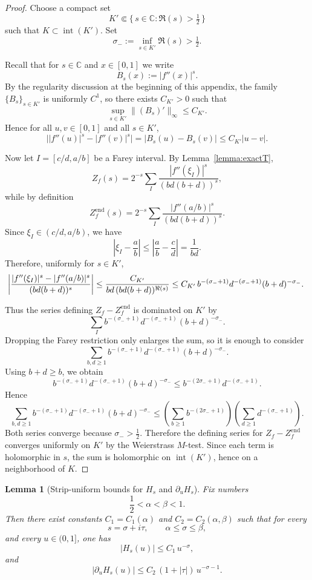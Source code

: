 \documentclass[a4paper,american,11pt]{amsart}
\theoremstyle{plain}
\newtheorem{lemma}[theorem]{Lemma}
\theoremstyle{definition}
\newcommand{\C}{\mathbb C}
\begin{document}
\begin{proof}
Choose a compact set
\[
K'\Subset \{\,s\in\C:\Re(s)>\tfrac12\,\}
\]
such that \(K\subset \operatorname{int}(K')\). Set
\[
\sigma_-:=\inf_{s\in K'}\Re(s)>\tfrac12.
\]

Recall that for \(s\in\C\) and \(x\in[0,1]\) we write
\[
B_s(x):=|f''(x)|^s.
\]
By the regularity discussion at the beginning of this appendix, the family \(\{B_s\}_{s\in K'}\)
is uniformly \(C^1\), so there exists \(C_{K'}>0\) such that
\[
\sup_{s\in K'}\|(B_s)'\|_\infty\le C_{K'}.
\]
Hence for all \(u,v\in[0,1]\) and all \(s\in K'\),
\[
\bigl||f''(u)|^s-|f''(v)|^s\bigr|
=
|B_s(u)-B_s(v)|
\le C_{K'}|u-v|.
\]

Now let \(I=[c/d,a/b]\) be a Farey interval. By Lemma~\ref{lemma:exactT},
\[
Z_f(s)=2^{-s}\sum_I \frac{|f''(\xi_I)|^s}{(bd(b+d))^s},
\]
while by definition
\[
Z_f^{\mathrm{end}}(s)=2^{-s}\sum_I \frac{|f''(a/b)|^s}{(bd(b+d))^s}.
\]
Since \(\xi_I\in(c/d,a/b)\), we have
\[
\left|\xi_I-\frac ab\right|
\le
\left|\frac ab-\frac cd\right|
=
\frac1{bd}.
\]
Therefore, uniformly for \(s\in K'\),
\[\mkern-6mu
\left|
\frac{|f''(\xi_I)|^s-|f''(a/b)|^s}{(bd(b+d))^s}
\right|
\le
\frac{C_{K'}}{bd\,(bd(b+d))^{\Re(s)}}
\le
C_{K'}\,b^{-(\sigma_-+1)}d^{-(\sigma_-+1)}(b+d)^{-\sigma_-}.
\]

Thus the series defining \(Z_f-Z_f^{\mathrm{end}}\) is dominated on \(K'\) by
\[
\sum_I b^{-(\sigma_-+1)}d^{-(\sigma_-+1)}(b+d)^{-\sigma_-}.
\]
Dropping the Farey restriction only enlarges the sum, so it is enough to consider
\[
\sum_{b,d\ge1} b^{-(\sigma_-+1)}d^{-(\sigma_-+1)}(b+d)^{-\sigma_-}.
\]
Using \(b+d\ge b\), we obtain
\[
b^{-(\sigma_-+1)}d^{-(\sigma_-+1)}(b+d)^{-\sigma_-}
\le
b^{-(2\sigma_-+1)}d^{-(\sigma_-+1)}.
\]
Hence
\[
\sum_{b,d\ge1} b^{-(\sigma_-+1)}d^{-(\sigma_-+1)}(b+d)^{-\sigma_-}
\le
\left(\sum_{b\ge1} b^{-(2\sigma_-+1)}\right)
\left(\sum_{d\ge1} d^{-(\sigma_-+1)}\right).
\]
Both series converge because \(\sigma_->\tfrac12\). Therefore the defining series for
\(Z_f-Z_f^{\mathrm{end}}\) converges uniformly on \(K'\) by the Weierstrass \(M\)-test.
Since each term is holomorphic in \(s\), the sum is holomorphic on \(\operatorname{int}(K')\),
hence on a neighborhood of \(K\).
\end{proof}

\begin{lemma}[Strip-uniform bounds for \(H_s\) and \(\partial_u H_s\)]
\label{lem:Hs-strip}
Fix numbers
\[
\frac12<\alpha<\beta<1.
\]
Then there exist constants \(C_1=C_1(\alpha)\) and \(C_2=C_2(\alpha,\beta)\) such that for every
\[
s=\sigma+i\tau,\qquad \alpha\le \sigma\le \beta,
\]
and every \(u\in(0,1]\), one has
\[
|H_s(u)|\le C_1\,u^{-\sigma},
\]
and
\[
|\partial_u H_s(u)|\le C_2\,(1+|\tau|)\,u^{-\sigma-1}.
\]
\end{lemma}
\end{document}
